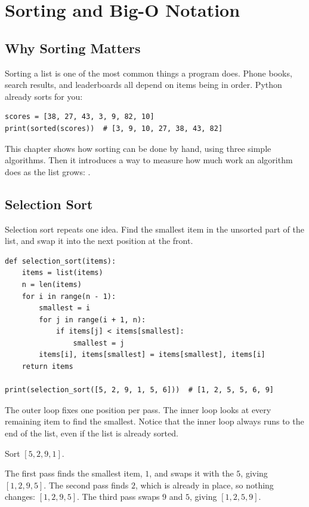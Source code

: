 \chapter{Sorting and Big-O Notation}

\section{Why Sorting Matters}
Sorting a list is one of the most common things a program does. Phone books,
search results, and leaderboards all depend on items being in order. Python
already sorts for you:

\begin{verbatim}
scores = [38, 27, 43, 3, 9, 82, 10]
print(sorted(scores))  # [3, 9, 10, 27, 38, 43, 82]
\end{verbatim}

This chapter shows how sorting can be done by hand, using three simple
algorithms. Then it introduces a way to measure how much work an algorithm
does as the list grows: .

\section{Selection Sort}
Selection sort repeats one idea. Find the smallest item in the unsorted part
of the list, and swap it into the next position at the front.

\begin{verbatim}
def selection_sort(items):
    items = list(items)
    n = len(items)
    for i in range(n - 1):
        smallest = i
        for j in range(i + 1, n):
            if items[j] < items[smallest]:
                smallest = j
        items[i], items[smallest] = items[smallest], items[i]
    return items

print(selection_sort([5, 2, 9, 1, 5, 6]))  # [1, 2, 5, 5, 6, 9]
\end{verbatim}

The outer loop fixes one position per pass. The inner loop looks at every
remaining item to find the smallest. Notice that the inner loop always runs to
the end of the list, even if the list is already sorted.

\begin{Worked}
\begin{Problem}
Sort $[5, 2, 9, 1]$.
\end{Problem}
\begin{Solution}
The first pass finds the smallest item, $1$, and swaps it with the $5$, giving $[1, 2, 9, 5]$. The second pass finds $2$, which is already in place, so nothing changes: $[1, 2, 9, 5]$. The third pass swaps $9$ and $5$, giving $[1, 2, 5, 9]$.
\end{Solution}
\end{Worked}

